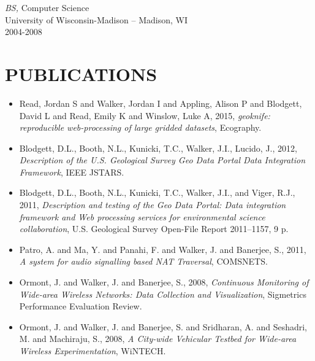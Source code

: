 \documentclass[line,margin]{res}
\begin{document}
\begin{resume}
		{\sl BS,} Computer Science \\
		University of Wisconsin-Madison -- Madison, WI \\
		2004-2008
  
\section{PUBLICATIONS}
	\begin{itemize} \itemsep -2pt
	\item Read, Jordan S and Walker, Jordan I and Appling, Alison P and Blodgett, David L and Read, Emily K and Winslow, Luke A, 2015, {\sl geoknife: reproducible web-processing of large gridded datasets}, Ecography.
	\item Blodgett, D.L., Booth, N.L., Kunicki, T.C., Walker, J.I., Lucido, J., 2012, {\sl Description of the U.S. Geological Survey Geo Data Portal Data Integration Framework}, IEEE JSTARS.
	\item Blodgett, D.L., Booth, N.L., Kunicki, T.C., Walker, J.I., and Viger, R.J., 2011, {\sl Description and testing of the Geo Data Portal: Data integration framework and Web processing services for environmental science collaboration}, U.S. Geological Survey Open-File Report 2011–1157, 9 p.
	\item Patro, A. and Ma, Y. and Panahi, F. and Walker, J. and Banerjee, S., 2011, {\sl A system for audio signalling based NAT Traversal}, COMSNETS.
    	 \item Ormont, J. and Walker, J. and Banerjee, S., 2008, {\sl Continuous Monitoring of Wide-area Wireless Networks: Data Collection and Visualization}, Sigmetrics Performance Evaluation Review.
	 \item Ormont, J. and Walker, J. and Banerjee, S. and Sridharan, A. and Seshadri, M. and Machiraju, S., 2008, {\sl A City-wide Vehicular Testbed for Wide-area Wireless Experimentation}, WiNTECH.
	\end{itemize}

\end{resume}
\end{document}
